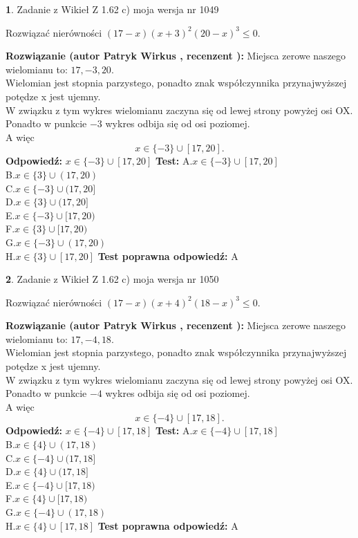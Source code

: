 \documentclass[12pt, a4paper]{article}
\theoremstyle{definition} %
\newtheorem{zad}{}
\newcommand{\zadStart}[1]{\begin{zad}#1\newline}
\newcommand{\zadStop}{\end{zad}}
\newcommand{\rozwStart}[2]{\noindent \textbf{Rozwiązanie (autor #1 , recenzent #2): }\newline}
\newcommand{\rozwStop}{\newline}
\newcommand{\odpStart}{\noindent \textbf{Odpowiedź:}\newline}
\newcommand{\odpStop}{\newline}
\newcommand{\testStart}{\noindent \textbf{Test:}\newline}
\newcommand{\testStop}{\newline}
\newcommand{\kluczStart}{\noindent \textbf{Test poprawna odpowiedź:}\newline}
\newcommand{\kluczStop}{\newline}
\begin{document}
\zadStart{Zadanie z Wikieł Z 1.62 c) moja wersja nr 1049}

Rozwiązać nierówności $(17-x)(x+3)^{2}(20-x)^{3}\le0$.
\zadStop
\rozwStart{Patryk Wirkus}{}
Miejsca zerowe naszego wielomianu to: $17, -3, 20$.\\
Wielomian jest stopnia parzystego, ponadto znak współczynnika przy\linebreak najwyższej potędze x jest ujemny.\\ W związku z tym wykres wielomianu zaczyna się od lewej strony powyżej osi OX.\\
Ponadto w punkcie $-3$ wykres odbija się od osi poziomej.\\
A więc $$x \in \{-3\} \cup [17,20].$$
\rozwStop
\odpStart
$x \in \{-3\} \cup [17,20]$
\odpStop
\testStart
A.$x \in \{-3\} \cup [17,20]$\\
B.$x \in \{3\} \cup (17,20)$\\
C.$x \in \{-3\} \cup (17,20]$\\
D.$x \in \{3\} \cup (17,20]$\\
E.$x \in \{-3\} \cup [17,20)$\\
F.$x \in \{3\} \cup [17,20)$\\
G.$x \in \{-3\} \cup (17,20)$\\
H.$x \in \{3\} \cup [17,20]$
\testStop
\kluczStart
A
\kluczStop



\zadStart{Zadanie z Wikieł Z 1.62 c) moja wersja nr 1050}

Rozwiązać nierówności $(17-x)(x+4)^{2}(18-x)^{3}\le0$.
\zadStop
\rozwStart{Patryk Wirkus}{}
Miejsca zerowe naszego wielomianu to: $17, -4, 18$.\\
Wielomian jest stopnia parzystego, ponadto znak współczynnika przy\linebreak najwyższej potędze x jest ujemny.\\ W związku z tym wykres wielomianu zaczyna się od lewej strony powyżej osi OX.\\
Ponadto w punkcie $-4$ wykres odbija się od osi poziomej.\\
A więc $$x \in \{-4\} \cup [17,18].$$
\rozwStop
\odpStart
$x \in \{-4\} \cup [17,18]$
\odpStop
\testStart
A.$x \in \{-4\} \cup [17,18]$\\
B.$x \in \{4\} \cup (17,18)$\\
C.$x \in \{-4\} \cup (17,18]$\\
D.$x \in \{4\} \cup (17,18]$\\
E.$x \in \{-4\} \cup [17,18)$\\
F.$x \in \{4\} \cup [17,18)$\\
G.$x \in \{-4\} \cup (17,18)$\\
H.$x \in \{4\} \cup [17,18]$
\testStop
\kluczStart
A
\kluczStop
\end{document}
